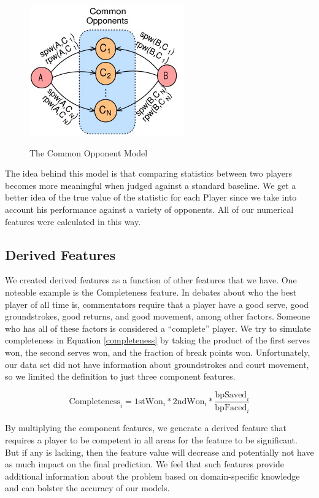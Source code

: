\documentclass[conference]{IEEEtran}
\begin{document}
	\begin{figure}[h]
		\includegraphics[scale=1.00]{common_opponent_model} %
		\label{fig:common_opponent_model}
		\centering
		\caption{The Common Opponent Model}
	\end{figure}

	The idea behind this model is that comparing statistics between two players becomes more meaningful when judged against a standard baseline. We get a better idea of the true value of the statistic for each Player since we take into account his performance against a variety of opponents. All of our numerical features were calculated in this way.


	\subsection{Derived Features}
	We created derived features as a function of other features that we have. One noteable example is the Completeness feature. In debates about who the best player of all time is, commentators require that a player have a good serve, good groundstrokes, good returns, and good movement, among other factors. Someone who has all of these factors is considered a ``complete'' player. We try to simulate completeness in Equation \ref{completeness} by taking the product of the first serves won, the second serves won, and the fraction of break points won. Unfortunately, our data set did not have information about groundstrokes and court movement, so we limited the definition to just three component features.

	\begin{equation} \label{completeness}
		\text{Completeness}_{i} = \text{1stWon}_{i} * \text{2ndWon}_{i} * \frac{\text{bpSaved}_{i}}{\text{bpFaced}_{i}}
	\end{equation}

	By multiplying the component features, we generate a derived feature that requires a player to be competent in all areas for the feature to be significant. But if any is lacking, then the feature value will decrease and potentially not have as much impact on the final prediction. We feel that such features provide additional information about the problem based on domain-specific knowledge and can bolster the accuracy of our models.
\end{document}
